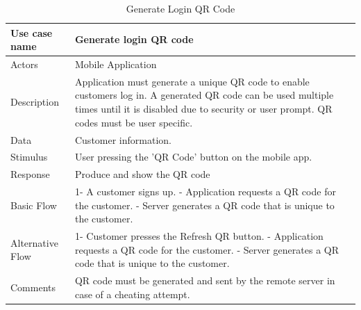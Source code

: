 \documentclass[11pt]{article}
\begin{document}
        \begin{table}[H]
        \begin{centering}
        \begin{tabular}{|p{2.5cm}|p{12cm}|}
        \hline
        Use case name & Generate login QR code \\ \hline
        Actors        & Mobile Application \\ \hline
        Description   & Application must generate a unique QR code to enable customers log in. A generated QR code can be used multiple times until it is disabled due to security or user prompt. QR codes must be user specific. \\ \hline
        Data          & Customer information. \\ \hline
        Stimulus      & User pressing the 'QR Code' button on the mobile app. \\ \hline
        Response      & Produce and show the QR code \\ \hline
        Basic Flow    & 
        1- A customer signs up. \newline
        2- Application requests a QR code for the customer. \newline
        3- Server generates a QR code that is unique to the customer.\\ \hline
        Alternative
            Flow      &
        1- Customer presses the Refresh QR button. \newline
        2- Application requests a QR code for the customer. \newline
        3- Server generates a QR code that is unique to the customer.\\ \hline
        Comments      & QR code must be generated and sent by the remote server in case of a cheating attempt. \\ \hline
        
        \end{tabular}
        \caption{Generate Login QR Code}
        \label{tab8}
        \end{centering}
        \end{table}    
        
        
                
\end{document}
